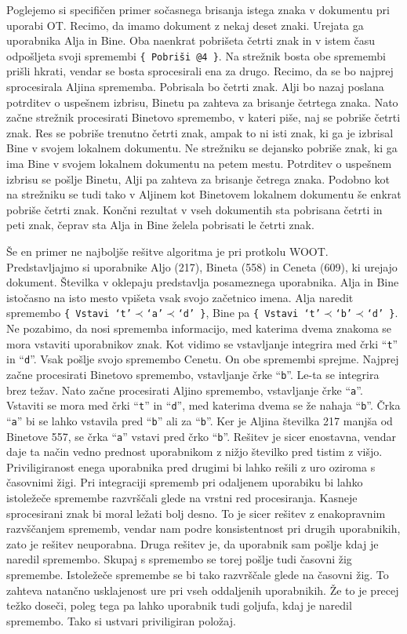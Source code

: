 \documentclass[a4paper, 12pt, twoside]{book}
\begin{document}
Poglejemo si specifičen primer sočasnega brisanja istega znaka v dokumentu pri uporabi OT. Recimo, da imamo dokument z nekaj deset znaki. Urejata ga uporabnika Alja in Bine. Oba naenkrat pobrišeta četrti znak in v istem času odpošljeta svoji spremembi {\tt \{ Pobriši @4 \}}. Na strežnik bosta obe spremembi prišli hkrati, vendar se bosta sprocesirali ena za drugo. Recimo, da se bo najprej sprocesirala Aljina sprememba. Pobrisala bo četrti znak. Alji bo nazaj poslana potrditev o uspešnem izbrisu, Binetu pa zahteva za brisanje četrtega znaka. Nato začne strežnik procesirati Binetovo spremembo, v kateri piše, naj se pobriše četrti znak. Res se pobriše trenutno četrti znak, ampak to ni isti znak, ki ga je izbrisal Bine v svojem lokalnem dokumentu. Ne strežniku se dejansko pobriše znak, ki ga ima Bine v svojem lokalnem dokumentu na petem mestu. Potrditev o uspešnem izbrisu se pošlje Binetu, Alji pa zahteva za brisanje četrega znaka. Podobno kot na strežniku se tudi tako v Aljinem kot Binetovem lokalnem dokumentu še enkrat pobriše četrti znak. Končni rezultat v vseh dokumentih sta pobrisana četrti in peti znak, čeprav sta Alja in Bine želela pobrisati le četrti znak.

Še en primer ne najboljše rešitve algoritma je pri protkolu WOOT. Predstavljajmo si uporabnike Aljo (217), Bineta (558) in Ceneta (609), ki urejajo dokument. Številka v oklepaju predstavlja posameznega uporabnika. Alja in Bine istočasno na isto mesto vpišeta vsak svojo začetnico imena. Alja naredit spremembo {\tt \{ Vstavi ‘t’$\prec$‘a’$\prec$‘d’ \}}, Bine pa {\tt \{ Vstavi ‘t’$\prec$‘b’$\prec$‘d’ \}}. Ne pozabimo, da nosi sprememba informacijo, med katerima dvema znakoma se mora vstaviti uporabnikov znak. Kot vidimo se vstavljanje integrira med črki “{\tt t}” in “{\tt d}”.  Vsak pošlje svojo spremembo Cenetu. On obe spremembi sprejme. Najprej začne procesirati Binetovo spremembo, vstavljanje črke “{\tt b}”. Le-ta se integrira brez težav. Nato začne procesirati Aljino spremembo, vstavljanje črke “{\tt a}”. Vstaviti se mora med črki “{\tt t}” in “{\tt d}”, med katerima dvema se že nahaja “{\tt b}”. Črka “{\tt a}” bi se lahko vstavila pred “{\tt b}” ali za “{\tt b}”. Ker je Aljina številka 217 manjša od Binetove 557, se črka “{\tt a}” vstavi pred črko “{\tt b}”. Rešitev je sicer enostavna, vendar daje ta način vedno prednost uporabnikom z nižjo številko pred tistim z višjo. Priviligiranost enega uporabnika pred drugimi bi lahko rešili z uro oziroma s časovnimi žigi. Pri integraciji sprememb pri odaljenem uporabiku bi lahko istoležeče spremembe razvrščali glede na vrstni red procesiranja. Kasneje sprocesirani znak bi moral ležati bolj desno. To je sicer rešitev z enakopravnim razvščanjem sprememb, vendar nam podre konsistentnost pri drugih uporabnikih, zato je rešitev neuporabna. Druga rešitev je, da uporabnik sam pošlje kdaj je naredil spremembo. Skupaj s spremembo se torej pošlje tudi časovni žig spremembe. Istoležeče spremembe se bi tako razvrščale glede na časovni žig. To zahteva natančno usklajenost ure pri vseh oddaljenih uporabnikih. Že to je precej težko doseči, poleg tega pa lahko uporabnik tudi goljufa, kdaj je naredil spremembo. Tako si ustvari priviligiran položaj.
\end{document}
